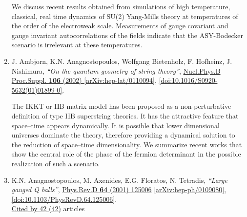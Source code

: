 \documentclass[a4paper,10pt]{article}
\begin{document}
\begin{enumerate}
We discuss recent results obtained from simulations of high temperature, classical, real time dynamics of SU(2) Yang-Mills theory at temperatures of the order of the electroweak scale. Measurements of gauge covariant and gauge invariant autocorrelations of the fields indicate that the ASY-Bodecker scenario is irrelevant at these temperatures.
\item J. Ambjorn, K.N. Anagnostopoulos, Wolfgang Bietenholz, F. Hofheinz, J. Nishimura, {\it ``On the quantum geometry of string theory''}, \href{https://www.doi.org/10.1016/S0920-5632(01)01899-0}{Nucl.Phys.B Proc.Suppl. {\bf 106} (2002) } \href{https://arxiv.org/abs/hep-lat/0110094}{[arXiv:hep-lat/0110094]}, \href{https://www.doi.org/10.1016/S0920-5632(01)01899-0}{[doi:10.1016/S0920-5632(01)01899-0]}.

The IKKT or IIB matrix model has been proposed as a non-perturbative definition of type IIB superstring theories. It has the attractive feature that space--time appears dynamically. It is possible that lower dimensional universes dominate the theory, therefore providing a dynamical solution to the reduction of space--time dimensionality. We summarize recent works that show the central role of the phase of the fermion determinant in the possible realization of such a scenario.
\item K.N. Anagnostopoulos, M. Axenides, E.G. Floratos, N. Tetradis, {\it ``Large gauged Q balls''}, \href{https://www.doi.org/10.1103/PhysRevD.64.125006}{Phys.Rev.D {\bf 64} (2001) 125006} \href{https://arxiv.org/abs/hep-ph/0109080}{[arXiv:hep-ph/0109080]}, \href{https://www.doi.org/10.1103/PhysRevD.64.125006}{[doi:10.1103/PhysRevD.64.125006]}.
\\\href{https://inspirehep.net/literature/?q=refersto%3Arecid%3A562558}{Cited by 42 (42)} articles


\end{enumerate}
\end{document}

